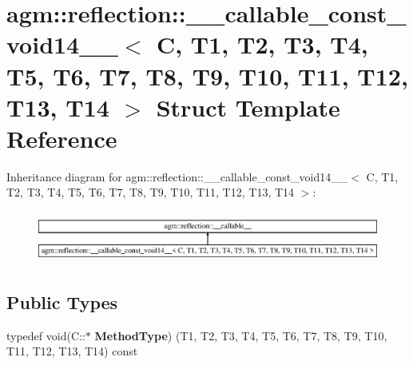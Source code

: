 \hypertarget{structagm_1_1reflection_1_1____callable__const__void14____}{}\section{agm\+:\+:reflection\+:\+:\+\_\+\+\_\+callable\+\_\+const\+\_\+void14\+\_\+\+\_\+$<$ C, T1, T2, T3, T4, T5, T6, T7, T8, T9, T10, T11, T12, T13, T14 $>$ Struct Template Reference}
\label{structagm_1_1reflection_1_1____callable__const__void14____}
Inheritance diagram for agm\+:\+:reflection\+:\+:\+\_\+\+\_\+callable\+\_\+const\+\_\+void14\+\_\+\+\_\+$<$ C, T1, T2, T3, T4, T5, T6, T7, T8, T9, T10, T11, T12, T13, T14 $>$\+:\begin{figure}[H]
\begin{center}
\leavevmode
\includegraphics[height=1.717791cm]{structagm_1_1reflection_1_1____callable__const__void14____}
\end{center}
\end{figure}
\subsection*{Public Types}
\begin{DoxyCompactItemize}
\item 
typedef void(C\+::$\ast$ {\bfseries Method\+Type}) (T1, T2, T3, T4, T5, T6, T7, T8, T9, T10, T11, T12, T13, T14) const \hypertarget{structagm_1_1reflection_1_1____callable__const__void14_____a80588d0c706ab6fe68b495bbb39f6997}{}\label{structagm_1_1reflection_1_1____callable__const__void14_____a80588d0c706ab6fe68b495bbb39f6997}

\end{DoxyCompactItemize}
